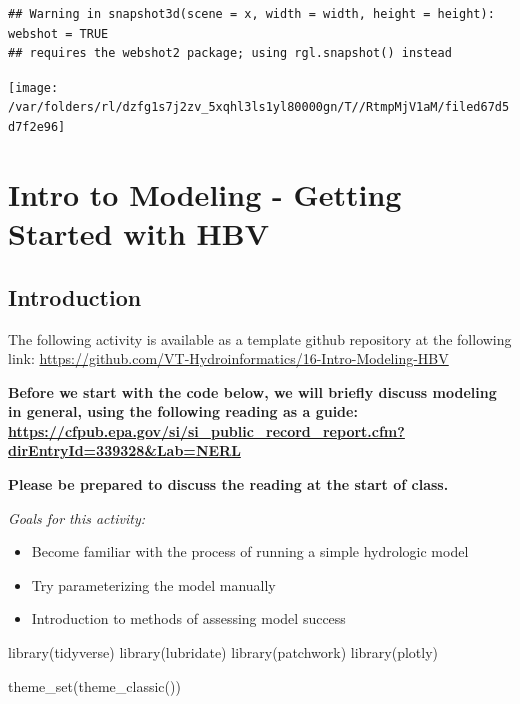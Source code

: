 \documentclass[
]{book}
\newenvironment{Shaded}{\begin{snugshade}}{\end{snugshade}}
\newcommand{\FunctionTok}[1]{\textcolor[rgb]{0.00,0.00,0.00}{#1}}
\newcommand{\NormalTok}[1]{#1}
\providecommand{\tightlist}{%
  \setlength{\itemsep}{0pt}\setlength{\parskip}{0pt}}
\begin{document}
\begin{verbatim}
## Warning in snapshot3d(scene = x, width = width, height = height): webshot = TRUE
## requires the webshot2 package; using rgl.snapshot() instead
\end{verbatim}

\texttt{[image: /var/folders/rl/dzfg1s7j2zv\_5xqhl3ls1yl80000gn/T//RtmpMjV1aM/filed67d5d7f2e96]}

\hypertarget{modelingintro}{%
\chapter{Intro to Modeling - Getting Started with HBV}\label{modelingintro}}

\hypertarget{introduction-4}{%
\section{Introduction}\label{introduction-4}}

The following activity is available as a template github repository at the following link: \url{https://github.com/VT-Hydroinformatics/16-Intro-Modeling-HBV}

\textbf{Before we start with the code below, we will briefly discuss modeling in general, using the following reading as a guide: \url{https://cfpub.epa.gov/si/si_public_record_report.cfm?dirEntryId=339328\&Lab=NERL}}

\textbf{Please be prepared to discuss the reading at the start of class.}

\emph{Goals for this activity:}

\begin{itemize}
\tightlist
\item
  Become familiar with the process of running a simple hydrologic model
\item
  Try parameterizing the model manually
\item
  Introduction to methods of assessing model success
\end{itemize}

\begin{Shaded}
\begin{Highlighting}[]
\FunctionTok{library}\NormalTok{(tidyverse)}
\FunctionTok{library}\NormalTok{(lubridate)}
\FunctionTok{library}\NormalTok{(patchwork)}
\FunctionTok{library}\NormalTok{(plotly)}

\FunctionTok{theme\_set}\NormalTok{(}\FunctionTok{theme\_classic}\NormalTok{())}
\end{Highlighting}
\end{Shaded}
\end{document}
